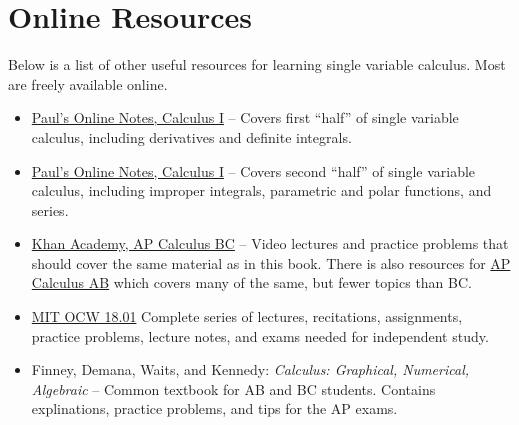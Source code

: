 \section{Online Resources}
Below is a list of other useful resources for learning single variable calculus.
Most are freely available online.

\begin{itemize}
	\item \href{https://tutorial.math.lamar.edu/Classes/CalcI/CalcI.aspx}{Paul's Online Notes, Calculus I} -- Covers first ``half'' of single variable calculus, including derivatives and definite integrals.
	\item \href{https://tutorial.math.lamar.edu/Classes/CalcII/CalcII.aspx}{Paul's Online Notes, Calculus I} -- Covers second ``half'' of single variable calculus, including improper integrals, parametric and polar functions, and series.
	\item \href{https://www.khanacademy.org/math/ap-calculus-bc}{Khan Academy, AP Calculus BC} -- Video lectures and practice problems that should cover the same material as in this book.
		There is also resources for \href{https://www.khanacademy.org/math/ap-calculus-ab}{AP Calculus AB} which covers many of the same, but fewer topics than BC.
	\item \href{https://ocw.mit.edu/courses/mathematics/18-01sc-single-variable-calculus-fall-2010/}{MIT OCW 18.01} Complete series of lectures, recitations, assignments, practice problems, lecture notes, and exams needed for independent study.
	\item Finney, Demana, Waits, and Kennedy: \textit{Calculus: Graphical, Numerical, Algebraic} -- Common textbook for AB and BC students.
		Contains explinations, practice problems, and tips for the AP exams.
\end{itemize}
